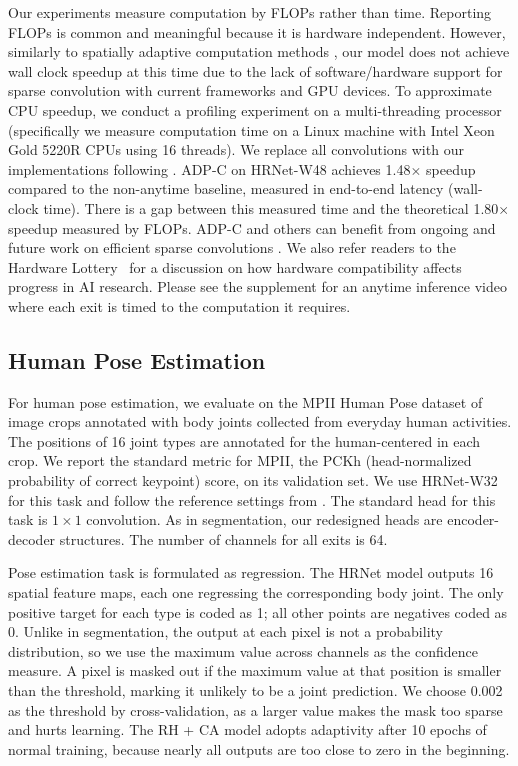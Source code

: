 Our experiments measure computation by FLOPs rather than time.
Reporting FLOPs is common \cite{figurnov2017spatially,xie2020spatially,huang2017multi,wang2018skipnet,liu2019rethinking} and meaningful because it is hardware independent.
However, similarly to spatially adaptive computation methods \cite{figurnov2017spatially,xie2020spatially}, our model does not achieve wall clock speedup at this time due to the lack of software/hardware support for sparse convolution with current frameworks and GPU devices.
To approximate CPU speedup, we conduct a profiling experiment on a multi-threading processor (specifically we measure computation time on a Linux machine with Intel Xeon Gold 5220R CPUs using 16 threads).
We replace all convolutions with our implementations following \cite{xie2020spatially}.
ADP-C on HRNet-W48 achieves 1.48$\times$ speedup compared to the non-anytime baseline, measured in end-to-end latency (wall-clock time).
There is a gap between this measured time and the theoretical 1.80$\times$ speedup measured by FLOPs. 
ADP-C and others can benefit from ongoing and future work on efficient sparse convolutions \cite{sparse1, sparse2,verelst2020dynamic,elsen2020fast}. We also refer readers to the Hardware Lottery~\cite{hooker2021hardware} for a discussion on how hardware compatibility affects progress in AI research. Please see the supplement for an anytime inference video where each exit is timed to the computation it requires.


\subsection{Human Pose Estimation}
For human pose estimation, we evaluate on the MPII Human Pose dataset \cite{andriluka14mpii} of
image crops annotated with body joints collected from everyday human activities.
The positions of 16 joint types are annotated for the human-centered in each crop.
We report the standard metric \cite{andriluka14mpii} for MPII, the PCKh (head-normalized probability of correct keypoint) score, on its validation set. 
We use HRNet-W32  for this task and follow the reference settings from \cite{sun2019deep}.
The standard head for this task is $1\times1$ convolution.
As in segmentation, our redesigned heads are encoder-decoder structures. 
The number of channels for all exits is 64. 

Pose estimation task is formulated as regression.
The HRNet model outputs 16 spatial feature maps, each one regressing the corresponding body joint. 
The only positive target for each type is coded as 1; all other points are negatives coded as 0.
Unlike in segmentation, the output at each pixel is not a probability distribution, so we use the maximum value across channels as the confidence measure.
A pixel is masked out if the maximum value at that position is smaller than the threshold, marking it unlikely to be a joint prediction.
We choose 0.002 as the threshold by cross-validation, as a larger value makes the mask too sparse and hurts learning. 
The RH + CA model adopts adaptivity after 10 epochs of normal training, because nearly all outputs are too close to zero in the beginning.
 
